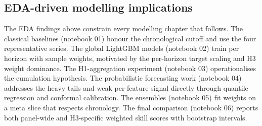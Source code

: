 \subsection{EDA-driven modelling implications}
\label{sec:eda:implications}

The EDA findings above constrain every modelling chapter that follows. The classical baselines (notebook 01) honour the chronological cutoff and use the four representative series. The global LightGBM models (notebook 02) train per horizon with sample weights, motivated by the per-horizon target scaling and H3 weight dominance. The H1-aggregation experiment (notebook 03) operationalises the cumulation hypothesis. The probabilistic forecasting work (notebook 04) addresses the heavy tails and weak per-feature signal directly through quantile regression and conformal calibration. The ensembles (notebook 05) fit weights on a meta slice that respects chronology. The final comparison (notebook 06) reports both panel-wide and H3-specific weighted skill scores with bootstrap intervals.
